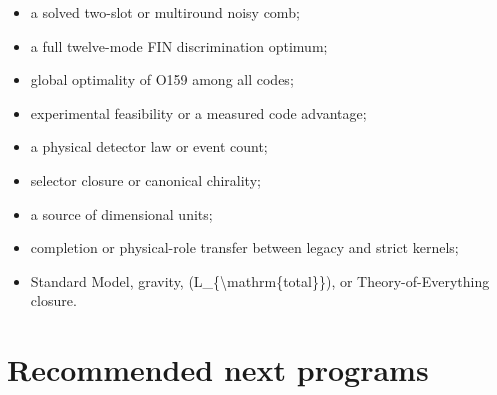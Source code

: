 \documentclass[11pt,a4paper,openany]{report}
\begin{document}
\begin{itemize}
\item 
a solved two-slot or multiround noisy comb;

\item 
a full twelve-mode FIN discrimination optimum;

\item 
global optimality of O159 among all codes;

\item 
experimental feasibility or a measured code advantage;

\item 
a physical detector law or event count;

\item 
selector closure or canonical chirality;

\item 
a source of dimensional units;

\item 
completion or physical-role transfer between legacy and strict kernels;

\item 
Standard Model, gravity, (L\_\{\textbackslash{}mathrm\{total\}\}), or Theory-of-Everything closure.

\end{itemize}

\chapter{Recommended next programs}
\end{document}
